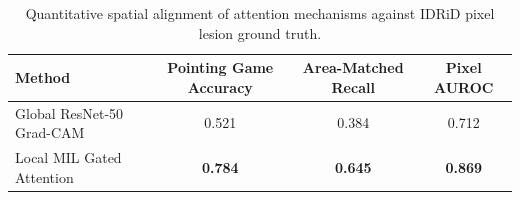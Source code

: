 \begin{table}[htbp]
\centering
\caption{Quantitative spatial alignment of attention mechanisms against IDRiD pixel lesion ground truth.}
\label{tab:xai_evaluation}
\small
\begin{tabular}{lccc}
\toprule
\textbf{Method} & \textbf{Pointing Game Accuracy} & \textbf{Area-Matched Recall} & \textbf{Pixel AUROC} \\
\midrule
Global ResNet-50 Grad-CAM & 0.521 & 0.384 & 0.712 \\
Local MIL Gated Attention & \textbf{0.784} & \textbf{0.645} & \textbf{0.869} \\
\bottomrule
\end{tabular}
\end{table}
